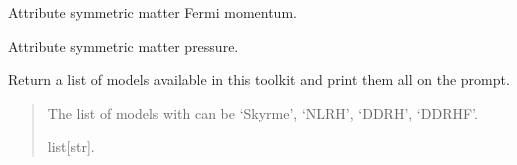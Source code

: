 \documentclass[letterpaper,10pt,english]{sphinxmanual}
\begin{document}
\begin{fulllineitems}

\begin{fulllineitems}
\label{\detokenize{source/api/setup_pheno:nucleardatapy.setup_pheno.SetupPheno.sm_kfn}}
\pysigstartsignatures
{}
\pysigstopsignatures
\sphinxAtStartPar
Attribute symmetric matter Fermi momentum.

\end{fulllineitems}


\begin{fulllineitems}
\label{\detokenize{source/api/setup_pheno:nucleardatapy.setup_pheno.SetupPheno.sm_pre}}
\pysigstartsignatures
{}
\pysigstopsignatures
\sphinxAtStartPar
Attribute symmetric matter pressure.

\end{fulllineitems}


\end{fulllineitems}


\begin{fulllineitems}
\label{\detokenize{source/api/setup_pheno:nucleardatapy.setup_pheno.models_pheno}}
\pysigstartsignatures
{}
\pysigstopsignatures
\sphinxAtStartPar
Return a list of models available in this toolkit and print them all on the prompt.
\begin{quote}\begin{description}
\sphinxAtStartPar
The list of models with can be ‘Skyrme’, ‘NLRH’, ‘DDRH’, ‘DDRHF’.

\sphinxAtStartPar
list{[}str{]}.

\end{description}\end{quote}

\end{fulllineitems}
\end{document}
